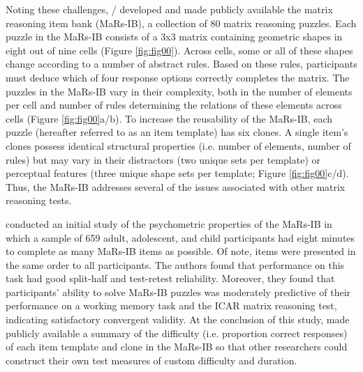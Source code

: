 \documentclass[a4paper,man,natbib]{apa6}
\begin{document}
Noting these challenges, \cite{knoll2016window} / \cite{chierchia2019matrix} developed and made publicly available the matrix reasoning item bank (MaRs-IB), a collection of 80 matrix reasoning puzzles. Each puzzle in the MaRs-IB consists of a 3x3 matrix containing geometric shapes in eight out of nine cells (Figure \ref{fig:fig00}). Across cells, some or all of these shapes change according to a number of abstract rules. Based on these rules, participants must deduce which of four response options correctly completes the matrix. The puzzles in the MaRs-IB vary in their complexity, both in the number of elements per cell and number of rules determining the relations of these elements across cells (Figure \ref{fig:fig00}a/b). To increase the reusability of the MaRs-IB, each puzzle (hereafter referred to as an item template) has six clones. A single item's clones possess identical structural properties (i.e. number of elements, number of rules) but may vary in their distractors (two unique sets per template) or perceptual features (three unique shape sets per template; Figure \ref{fig:fig00}c/d). Thus, the MaRs-IB addresses several of the issues associated with other matrix reasoning tests.   

\cite{chierchia2019matrix} conducted an initial study of the psychometric properties of the MaRs-IB in which a sample of 659 adult, adolescent, and child participants had eight minutes to complete as many MaRs-IB items as possible. Of note, items were presented in the same order to all participants. The authors found that performance on this task had good split-half and test-retest reliability. Moreover, they found that participants' ability to solve MaRs-IB puzzles was moderately predictive of their performance on a working memory task and the ICAR matrix reasoning test, indicating satisfactory convergent validity. At the conclusion of this study, \cite{chierchia2019matrix} made publicly available a summary of the difficulty (i.e. proportion correct responses) of each item template and clone in the MaRs-IB so that other researchers could construct their own test measures of custom difficulty and duration.
\end{document}
